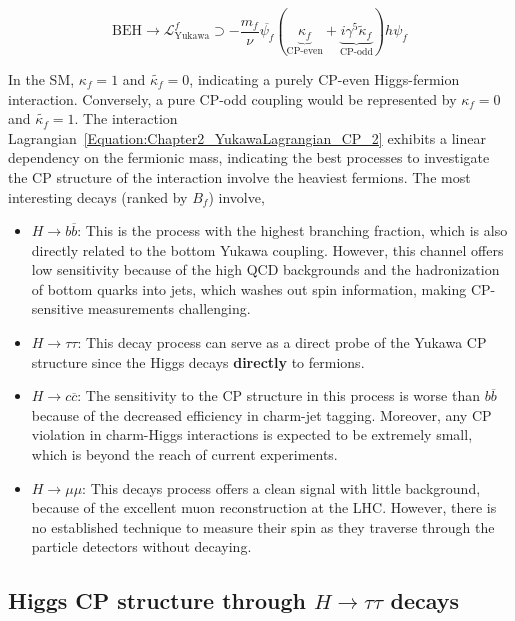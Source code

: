 \begin{equation}
    \text{BEH} \rightarrow \mathcal{L}_{\text{Yukawa}}^f \supset - \frac{m_f}{\nu}\overline{\psi_f} (\underbrace{\kappa_f}_{\text{CP-even}} + \underbrace{i\gamma^5\tilde{\kappa}_f}_{\text{CP-odd}})h\psi_f
\label{Equation:Chapter2_YukawaLagrangian_CP_2}
\end{equation}

In the SM, $\kappa_f = 1$ and $\tilde{\kappa_f} = 0$, indicating a purely CP-even Higgs-fermion interaction. Conversely, a pure CP-odd coupling would be represented by $\kappa_f = 0$ and $\tilde{\kappa_f} = 1$. The interaction Lagrangian~\ref{Equation:Chapter2_YukawaLagrangian_CP_2} exhibits a linear dependency on the fermionic mass, indicating the best processes to investigate the CP structure of the interaction involve the heaviest fermions. The most interesting decays (ranked by $B_f$) involve,

\begin{itemize}
    \item $H \to b\overline{b}$: This is the process with the highest branching fraction, which is also directly related to the bottom Yukawa coupling. However, this channel offers low sensitivity because of the high QCD backgrounds and the hadronization of bottom quarks into jets, which washes out spin information, making CP-sensitive measurements challenging.

    \item $H \to \tau \tau$: This decay process can serve as a direct probe of the Yukawa CP structure since the Higgs decays \textbf{directly} to fermions. 

    \item $H \to c \overline{c}$: The sensitivity to the CP structure in this process is worse than $b\overline{b}$ because of the decreased efficiency in charm-jet tagging. Moreover, any CP violation in charm-Higgs interactions is expected to be extremely small, which is beyond the reach of current experiments.

    \item $H \to \mu \mu$: This decays process offers a clean signal with little background, because of the excellent muon reconstruction at the LHC. However, there is no established technique to measure their spin as they traverse through the particle detectors without decaying. 
\end{itemize}

\subsection{Higgs CP structure through \texorpdfstring{$H\to\tau\tau$}{H→tautau} decays}

